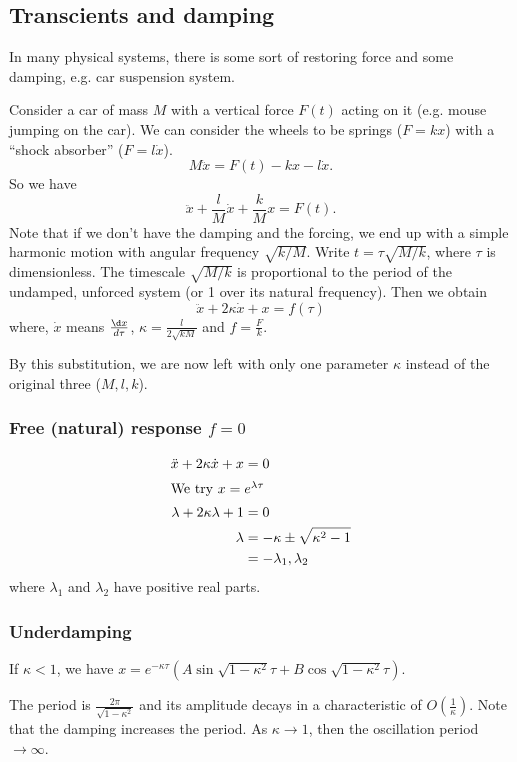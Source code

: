 \documentclass[a4paper]{article}
\begin{document}
\subsection{Transcients and damping}
In many physical systems, there is some sort of restoring force and some damping, e.g. car suspension system.

Consider a car of mass $M$ with a vertical force $F(t)$ acting on it (e.g. mouse jumping on the car). We can consider the wheels to be springs ($F = kx$) with a ``shock absorber'' ($F = l\dot x$).
\[
M\ddot x = F(t) - kx - l\dot x.
\]
So we have
\[
\ddot x + \frac{l}{M}\dot x + \frac{k}{M}x = F(t).
\]
Note that if we don't have the damping and the forcing, we end up with a simple harmonic motion with angular frequency $\sqrt{k/M}$. Write $t = \tau \sqrt{M/k}$, where $\tau$ is dimensionless. The timescale $\sqrt{M/k}$ is proportional to the period of the undamped, unforced system (or 1 over its natural frequency). Then we obtain
\[
\ddot x + 2\kappa\dot x + x = f(\tau)
\]
where, $\dot x$ means $\frac{\d x}{d\tau}$, $\kappa = \frac{l}{2\sqrt{kM}}$ and $f = \frac{F}{k}$.

By this substitution, we are now left with only one parameter $\kappa$ instead of the original three ($M, l, k$).

\subsubsection{Free (natural) response \texorpdfstring{$f = 0$}{f = 0}}
\begin{align*}
  \ddot x + 2\kappa \dot x + x &= 0\\
\intertext{We try $x = e^{\lambda \tau}$}
  \lambda + 2\kappa\lambda + 1 &= 0\\
  \lambda &= -\kappa \pm \sqrt{\kappa^2 - 1}\\
  &= -\lambda_1, \lambda_2
\end{align*}
where $\lambda_1$ and $\lambda_2$ have positive real parts.

\subsubsection{Underdamping}

If $\kappa < 1$, we have $x = e^{-\kappa\tau}(A\sin \sqrt{1 - \kappa^2}\tau  +B\cos \sqrt{1 - \kappa^2}\tau)$.

The period is $\frac{2\pi}{\sqrt{1 - \kappa^2}}$ and its amplitude decays in a characteristic of $O(\frac{1}{\kappa})$. Note that the damping increases the period. As $\kappa \to 1$, then the oscillation period $\to \infty$.
\end{document}
